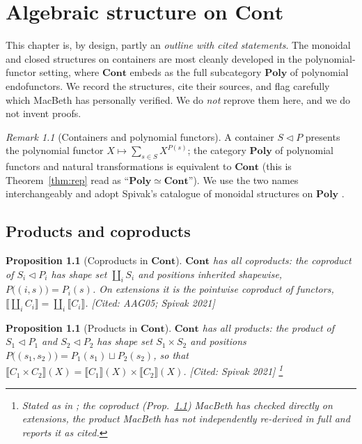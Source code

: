 \documentclass[11pt,a4paper]{book}
\newcommand{\Cont}{\mathbf{Cont}}
\newcommand{\Poly}{\mathbf{Poly}}
\newcommand{\cont}[2]{#1 \triangleleft #2}
\newcommand{\Ext}[1]{\llbracket #1 \rrbracket}
\theoremstyle{plain}
\newtheorem{Proposition}[Theorem]{Proposition}
\theoremstyle{definition}
\theoremstyle{remark}
\newtheorem{Remark}[Theorem]{Remark}
\newcommand{\prov}[1]{\hfill\textsf{\footnotesize[#1]}}
\begin{document}
\chapter{Algebraic structure on \texorpdfstring{$\Cont$}{Cont}}
\label{ch:algebra}

This chapter is, by design, partly an \emph{outline with cited statements}. The
monoidal and closed structures on containers are most cleanly developed in the
polynomial-functor setting, where $\Cont$ embeds as the full subcategory $\Poly$
of polynomial endofunctors. We record the structures, cite their sources, and
flag carefully which MacBeth has personally verified. We do \emph{not} reprove
them here, and we do not invent proofs.

\begin{Remark}[Containers and polynomial functors]
A container $\cont SP$ presents the polynomial functor
$X\mapsto\sum_{s\in S}X^{P(s)}$; the category $\Poly$ of polynomial functors and
natural transformations is equivalent to $\Cont$ (this is
Theorem~\ref{thm:rep} read as ``$\Poly\simeq\Cont$''). We use the two names
interchangeably and adopt Spivak's catalogue of monoidal structures on $\Poly$
\cite{Spivak21}.
\end{Remark}

\section{Products and coproducts}

\begin{Proposition}[Coproducts in $\Cont$]\label{prop:coprod}
$\Cont$ has all coproducts: the coproduct of $\cont{S_i}{P_i}$ has shape set
$\coprod_i S_i$ and positions inherited shapewise,
$P\bigl((i,s)\bigr)=P_i(s)$. On extensions it is the pointwise coproduct of
functors, $\Ext{\coprod_i C_i}=\coprod_i\Ext{C_i}$.
\prov{Cited: AAG05; Spivak 2021}
\end{Proposition}

\begin{Proposition}[Products in $\Cont$]\label{prop:prod}
$\Cont$ has all products: the product of $\cont{S_1}{P_1}$ and $\cont{S_2}{P_2}$
has shape set $S_1\times S_2$ and positions
$P\bigl((s_1,s_2)\bigr)=P_1(s_1)\sqcup P_2(s_2)$, so that
$\Ext{C_1\times C_2}(X)=\Ext{C_1}(X)\times\Ext{C_2}(X)$.
\prov{Cited: Spivak 2021}%
\footnote{Stated as in \cite{Spivak21}; the coproduct (Prop.~\ref{prop:coprod})
MacBeth has checked directly on extensions, the product MacBeth has \emph{not}
independently re-derived in full and reports it as cited.}
\end{Proposition}
\end{document}
